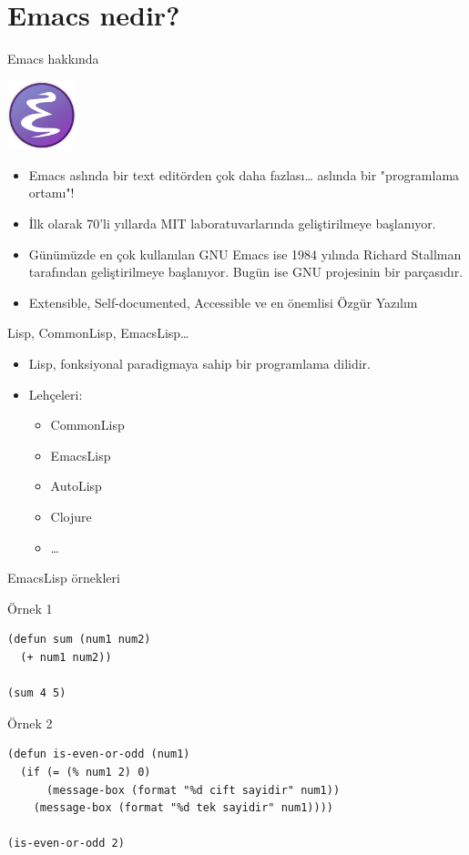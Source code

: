 \documentclass[presentation,smaller]{beamer}
\begin{document}
\section{Emacs nedir?}
\label{sec:org4009acc}
\begin{frame}[label={sec:orgd3539ee}]{Emacs hakkında}
\begin{center}
\includegraphics[height=2cm]{./_images/emacs_logo.png}
\end{center}

\begin{itemize}
\item Emacs aslında bir text editörden çok daha fazlası\ldots{} aslında bir "programlama ortamı"!
\item İlk olarak 70'li yıllarda MIT laboratuvarlarında geliştirilmeye başlanıyor.
\item Günümüzde en çok kullanılan GNU Emacs ise 1984 yılında Richard Stallman
tarafından geliştirilmeye başlanıyor. Bugün ise GNU projesinin bir parçasıdır.
\item Extensible, Self-documented, Accessible ve en önemlisi Özgür Yazılım
\end{itemize}
\end{frame}
\begin{frame}[label={sec:org5fb5876}]{Lisp, CommonLisp, EmacsLisp\ldots{}}
\begin{itemize}
\item Lisp, fonksiyonal paradigmaya sahip bir programlama dilidir.
\item Lehçeleri:
\begin{itemize}
\item CommonLisp
\item EmacsLisp
\item AutoLisp
\item Clojure
\item \ldots{}
\end{itemize}
\end{itemize}
\end{frame}
\begin{frame}[label={sec:orgf782eea},fragile]{EmacsLisp örnekleri}
 \begin{block}{Örnek 1}
\begin{verbatim}
(defun sum (num1 num2)
  (+ num1 num2))

(sum 4 5)
\end{verbatim}
\end{block}

\begin{block}{Örnek 2}
\begin{verbatim}
(defun is-even-or-odd (num1)
  (if (= (% num1 2) 0)
      (message-box (format "%d cift sayidir" num1))
    (message-box (format "%d tek sayidir" num1))))

(is-even-or-odd 2)
\end{verbatim}
\end{block}
\end{frame}
\end{document}
